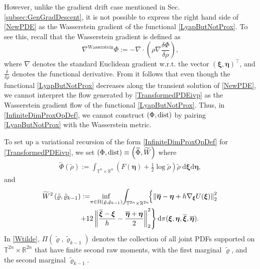 \documentclass[10pt,twocolumn]{IEEEtran}
\begin{document}
However, unlike the gradient drift case mentioned in Sec. \ref{subsec:GenGradDescent}, it is not possible to express the right hand side of \eqref{NewPDE} as the Wasserstein gradient of the functional \eqref{LyapButNotProx}. To see this, recall that the Wasserstein gradient is defined as \cite[Ch. 8]{ambrosio2008gradient} 
$$\nabla^{\text{Wasserstein}}\Phi := -\nabla\cdot\left(\rho\nabla\dfrac{\delta\Phi}{\delta\rho}\right),$$
where $\nabla$ denotes the standard Euclidean gradient w.r.t. the vector $(\bm{\xi},\bm{\eta})^{\top}$, and $\frac{\delta}{\delta\rho}$ denotes the functional derivative. %
From \cite[Appendix A (see eq. (31), (33) and (34a))]{halder2021stochasticExpanded} it follows that even though the functional \eqref{LyapButNotProx} decreases along the transient solution of \eqref{NewPDE}, we cannot interpret the flow generated by \eqref{TransformedPDEivp} as the Wasserstein gradient flow of the functional \eqref{LyapButNotProx}. Thus, in \eqref{InfiniteDimProxOpDef}, we cannot construct $(\Phi,{\rm{dist}})$ by pairing \eqref{LyapButNotProx} with the Wasserstein metric.

To set up a variational recursion of the form \eqref{InfiniteDimProxOpDef} for \eqref{TransformedPDEivp}, we set $(\Phi,{\rm{dist}}) \equiv \left(\widetilde{\Phi},\widetilde{W}\right)$ where
\begin{align}
\widetilde{\Phi}(\tilde{\rho}) := \int_{\mathbb{T}^{n} \times \mathbb{R}^{n}}\left(F(\boldsymbol{\eta})+\frac{1}{2} \log \tilde{\rho}\right) \tilde{\rho}\: \mathrm{d} \boldsymbol{\xi} \mathrm{d} \boldsymbol{\eta},
\label{Phitilde}	
\end{align}
and 
\begin{align}
\widetilde{W}^{2}\left(\tilde{\varrho}, \tilde{\varrho}_{k-1}\right):=\!&\inf _{\pi \in \Pi\left(\tilde{\varrho}, \tilde{\varrho}_{k-1}\right)}\!\int_{\mathbb{T}^{2 n} \times \mathbb{R}^{2 n}}\!\!\left\{\left\|\overline{\boldsymbol{\eta}}-\boldsymbol{\eta}+h \nabla_{\boldsymbol{\xi}} U(\boldsymbol{\xi})\right\|_{2}^{2}\right.\nonumber\\
&\hspace*{-0.2in}\left.+12\left\|\frac{\overline{\boldsymbol{\xi}}-\boldsymbol{\xi}}{h}-\frac{\overline{\boldsymbol{\eta}}+\boldsymbol{\eta}}{2}\right\|_{2}^{2}\right\} \mathrm{d} \pi(\boldsymbol{\xi}, \boldsymbol{\eta}, \overline{\boldsymbol{\xi}}, \overline{\boldsymbol{\eta}}).
\label{Wtilde}	
\end{align}
In \eqref{Wtilde}, $\Pi\left(\tilde{\varrho}, \tilde{\varrho}_{k-1}\right)$ denotes the collection of all joint PDFs supported on $\mathbb{T}^{2 n} \times \mathbb{R}^{2 n}$ that have finite second raw moments, with the first marginal $\tilde{\varrho}$, and the second marginal $\tilde{\varrho}_{k-1}$.
\end{document}
